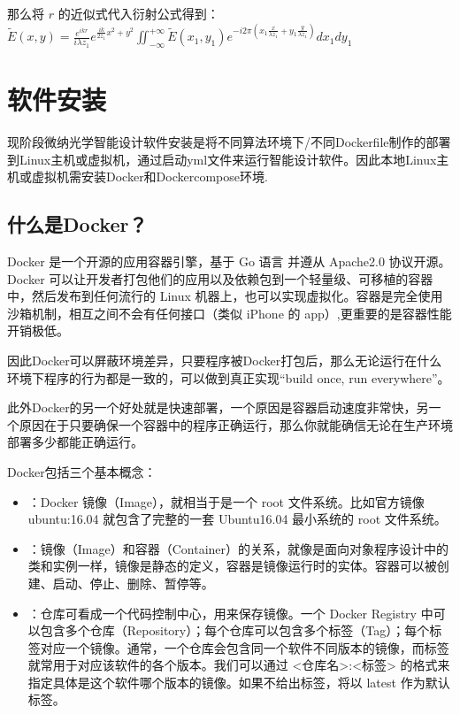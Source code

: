 \documentclass[a4paper,10pt,english]{sphinxmanual}
\begin{document}
\sphinxAtStartPar
那么将 \(r\) 的近似式代入衍射公式得到：
\(\tilde{E}(x,y)=\frac{e^{ikr}}{i\lambda z_1}e^{\frac{ik}{2z_1}{x^2+y^2}}\iint_{-\infty}^{+\infty}{\tilde{E}(x_1,y_1)e^{-i2\pi(x_1\frac{x}{\lambda z_1}+y_1\frac{y}{\lambda z_1})}dx_1dy_1}\)

\sphinxstepscope


\chapter{软件安装}
\label{\detokenize{_u8f6f_u4ef6_u5b89_u88c5/index:id1}}\label{\detokenize{_u8f6f_u4ef6_u5b89_u88c5/index::doc}}
\sphinxAtStartPar
现阶段微纳光学智能设计软件安装是将不同算法环境下/不同Dockerfile制作的部署到Linux主机或虚拟机，通过启动yml文件来运行智能设计软件。因此本地Linux主机或虚拟机需安装Docker和Docker\sphinxhyphen{}compose环境.


\section{什么是Docker？}
\label{\detokenize{_u8f6f_u4ef6_u5b89_u88c5/index:docker}}
\sphinxAtStartPar
Docker 是一个开源的应用容器引擎，基于 Go 语言 并遵从 Apache2.0 协议开源。Docker 可以让开发者打包他们的应用以及依赖包到一个轻量级、可移植的容器中，然后发布到任何流行的 Linux 机器上，也可以实现虚拟化。容器是完全使用沙箱机制，相互之间不会有任何接口（类似 iPhone 的 app）,更重要的是容器性能开销极低。

\sphinxAtStartPar
因此Docker可以屏蔽环境差异，只要程序被Docker打包后，那么无论运行在什么环境下程序的行为都是一致的，可以做到真正实现“build once, run everywhere”。

\sphinxAtStartPar
此外Docker的另一个好处就是快速部署，一个原因是容器启动速度非常快，另一个原因在于只要确保一个容器中的程序正确运行，那么你就能确信无论在生产环境部署多少都能正确运行。

\sphinxAtStartPar
Docker包括三个基本概念：
\begin{itemize}
\item {} 
\sphinxAtStartPar
{}：Docker 镜像（Image），就相当于是一个 root 文件系统。比如官方镜像 ubuntu:16.04 就包含了完整的一套 Ubuntu16.04 最小系统的 root 文件系统。

\item {} 
\sphinxAtStartPar
{}：镜像（Image）和容器（Container）的关系，就像是面向对象程序设计中的类和实例一样，镜像是静态的定义，容器是镜像运行时的实体。容器可以被创建、启动、停止、删除、暂停等。

\item {} 
\sphinxAtStartPar
{}：仓库可看成一个代码控制中心，用来保存镜像。一个 Docker Registry 中可以包含多个仓库（Repository）；每个仓库可以包含多个标签（Tag）；每个标签对应一个镜像。通常，一个仓库会包含同一个软件不同版本的镜像，而标签就常用于对应该软件的各个版本。我们可以通过 \textless{}仓库名\textgreater{}:\textless{}标签\textgreater{} 的格式来指定具体是这个软件哪个版本的镜像。如果不给出标签，将以 latest 作为默认标签。

\end{itemize}
\end{document}
